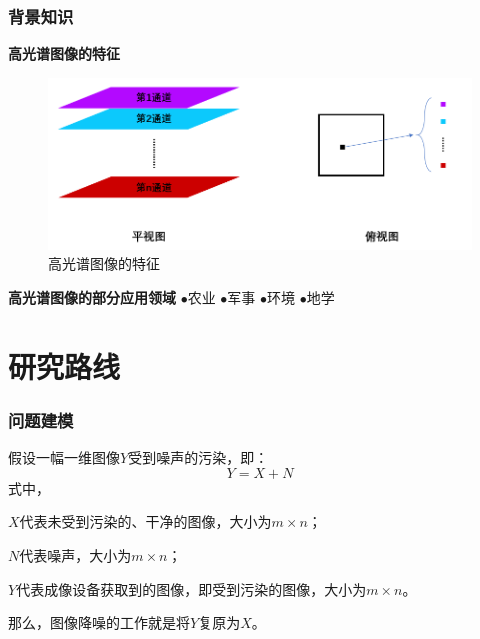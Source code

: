 \documentclass[10pt,aspectratio=43,mathserif]{beamer}
\begin{document}
\begin{frame}
\frametitle{\textbf{背景知识}}
\begin{block}{\textbf{高光谱图像的特征}}
\begin{figure}[H]
\centering
\includegraphics[scale=0.5]{img-characterofphotograph.png}
\caption{高光谱图像的特征}
\end{figure}
\end{block}
    	
\begin{block}{\textbf{高光谱图像的部分应用领域}}
$\bullet$农业 \qquad 
$\bullet$军事 \qquad 
$\bullet$环境 \qquad 
$\bullet$地学
\end{block}
\end{frame}

%

\section[研究路线]{研究路线}
\begin{frame}
\frametitle{\textbf{问题建模}}
\par 假设一幅一维图像$Y$受到噪声的污染，即：
\begin{displaymath}
Y = X + N
\end{displaymath}
式中，
\par$X$代表未受到污染的、干净的图像，大小为$m \times n$；
\par$N$代表噪声，大小为$m \times n$；
\par$Y$代表成像设备获取到的图像，即受到污染的图像，大小为$m \times n$。
\newline
\par 那么，图像降噪的工作就是将$Y$复原为$X$。
\end{frame}
\end{document}
